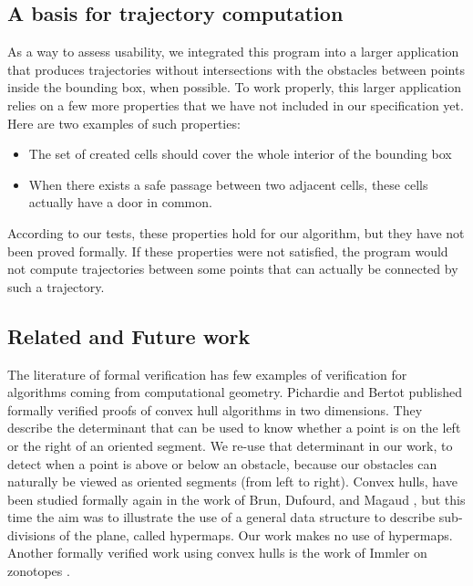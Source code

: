 \documentclass[a4paper, USenglish, cleveref, autoref, thm-restate, final]{lipics-v2021}
\begin{document}
\subsection{A basis for trajectory computation}
As a way to assess usability, we integrated this program into a larger
application that produces trajectories without intersections with
the obstacles between points inside the bounding
box, when possible.  To work properly, this larger application relies
on a few more properties that we have not included in our specification yet.
Here are two examples of such properties:
\begin{itemize}
\item The set of created cells should cover the whole interior of the
  bounding box
\item When there exists a safe passage between two adjacent cells, these
  cells actually have a door in common.
\end{itemize}
According to our tests, these properties hold for our algorithm, but
they have not been proved formally.  If these properties were not satisfied,
the program would not compute trajectories between some points that can
actually be connected by such a trajectory.

\subsection{Related and Future work}
The literature of formal verification has few examples of verification for
algorithms coming from computational geometry.  Pichardie and Bertot
\cite{pichardie:hal-01702679} published
formally verified proofs of convex hull algorithms in two dimensions.  They
describe the determinant that can be used to know whether a point is on the
left or the right of an oriented segment.  We re-use that determinant in our
work, to detect when a point is above or below an obstacle, because our
obstacles can naturally be viewed as oriented segments (from left to right).
Convex hulls, have been studied formally again in the work of Brun, Dufourd,
and Magaud \cite{brun:hal-00955400}, but this time the aim was to illustrate
the use of a general data structure to describe sub-divisions of the plane,
called hypermaps.  Our work makes no use of hypermaps.  Another formally
verified work using convex hulls is the work of Immler on
zonotopes \cite{ImmlerZonotopes15}.
\end{document}
